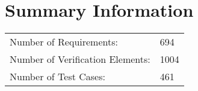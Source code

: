 \newpage
\section{Summary Information}
\begin{longtable}{ll}
\toprule
Number of Requirements: & 694 \\
Number of Verification Elements: & 1004 \\
Number of Test Cases: & 461 \\
\bottomrule
\end{longtable}
